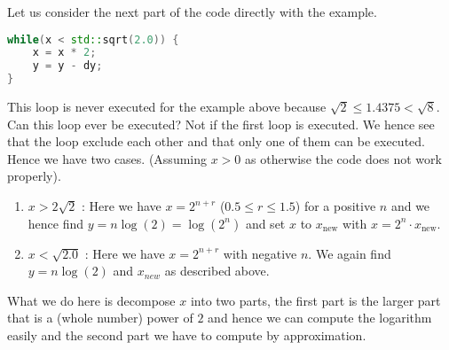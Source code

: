 \documentclass{article}
\begin{document}
\noindent Let us consider the next part of the code directly with the example.
\begin{lstlisting}[language=C++,
                   directivestyle={\color{black}}
                   emph={int,char,double,float,unsigned},
                   emphstyle={\color{blue}}
                  ]
while(x < std::sqrt(2.0)) {
    x = x * 2;
    y = y - dy;
}
\end{lstlisting}
This loop is never executed for the example above because $\sqrt{2} \leq 1.4375 < \sqrt{8}$. Can this loop ever be executed? Not if the first loop is executed. We hence see that the loop exclude each other and that only one of them can be executed. Hence we have two cases. (Assuming $x > 0$ as otherwise the code does not work properly). 
\begin{enumerate}
    \item $x > 2\sqrt{2}$ : Here we have $x = 2^{n + r}$ ($0.5 \leq r\leq 1.5$) for a positive $n$ and we hence find $y = n\log\left(2\right) = \log\left(2^{n}\right)$ and set $x$ to $x_{\text{new}}$ with $x = 2^{n} \cdot x_{\text{new}}$.
    \item $x < \sqrt{2.0}$ : Here we have $x = 2^{n+r}$ with negative $n$. We again find $y = n\log\left(2\right)$ and $x_{new}$ as described above.
\end{enumerate}
What we do here is decompose $x$ into two parts, the first part is the larger part that is a (whole number) power of $2$ and hence we can compute the logarithm easily and the second part we have to compute by approximation.
\end{document}
